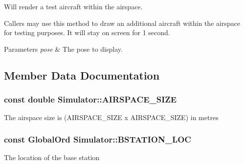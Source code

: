 Will render a test aircraft within the airspace. 

Callers may use this method to draw an additional aircraft within the airspace for testing purposes. It will stay on screen for 1 second.


\begin{DoxyParams}{Parameters}
{\em pose} & The pose to display. \\
\hline
\end{DoxyParams}


\subsection{Member Data Documentation}
\subsubsection[{\texorpdfstring{A\+I\+R\+S\+P\+A\+C\+E\+\_\+\+S\+I\+ZE}{AIRSPACE_SIZE}}]{\setlength{\rightskip}{0pt plus 5cm}const double Simulator\+::\+A\+I\+R\+S\+P\+A\+C\+E\+\_\+\+S\+I\+ZE\hspace{0.3cm}{\ttfamily [static]}}\hypertarget{classSimulator_af702e54e90c0fecb27f270890d41442c}{}\label{classSimulator_af702e54e90c0fecb27f270890d41442c}
The airspace size is (A\+I\+R\+S\+P\+A\+C\+E\+\_\+\+S\+I\+ZE x A\+I\+R\+S\+P\+A\+C\+E\+\_\+\+S\+I\+ZE) in metres 
\subsubsection[{\texorpdfstring{B\+S\+T\+A\+T\+I\+O\+N\+\_\+\+L\+OC}{BSTATION_LOC}}]{\setlength{\rightskip}{0pt plus 5cm}const {\bf Global\+Ord} Simulator\+::\+B\+S\+T\+A\+T\+I\+O\+N\+\_\+\+L\+OC\hspace{0.3cm}{\ttfamily [static]}}\hypertarget{classSimulator_a4a32de8a20938532139a6746499d7285}{}\label{classSimulator_a4a32de8a20938532139a6746499d7285}
The location of the base station 
